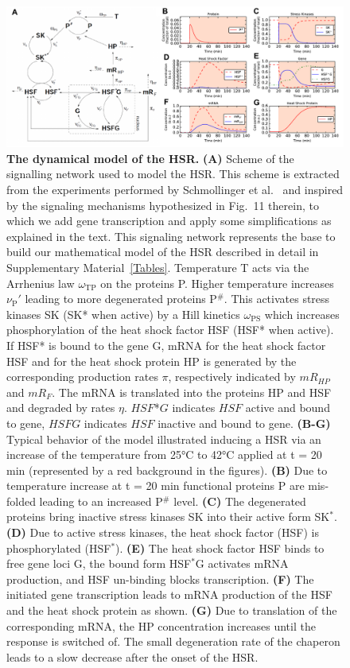 \documentclass[oneside, 10pt, a4paper, twocolumn]{article}
\begin{document}
\begin{figure}
\centering
\includegraphics[width=\textwidth]{Figure1_Paper.pdf}
\caption{\small{\textbf{The dynamical model of the HSR.} \textbf{(A)} Scheme of the signalling network used to model the HSR. {This scheme is extracted from the experiments performed by Schmollinger et al.~\cite{Schmollinger2013} and inspired by the signaling mechanisms hypothesized in Fig.~11 therein, {to} which we add gene transcription and apply some simplifications as explained in the text. This signaling network represents the base to build our mathematical model of the HSR described in detail in Supplementary Material~\ref{Tables}.} Temperature T acts via %
the Arrhenius law $\omega_\text{TP}$ on the proteins P. 
Higher temperature increases $\nu_\text{P}'$ leading to more degenerated proteins P$^\#$. 
This activates stress kinases SK (SK* when active) by a {Hill kinetics} $\omega_\text{PS}$ which increases {phosphorylation} of the heat shock factor HSF (HSF* when active). 
If HSF* is bound to the gene G, mRNA for the heat shock factor HSF and for the heat shock protein HP is generated by the corresponding production rates $\pi$, respectively indicated by $mR_{HP}$ and $mR_{F}$. 
The mRNA is translated into the proteins HP and HSF and degraded by rates $\eta$. $HSF$*$G$ indicates $HSF$ active and bound to gene, $HSFG$ indicates $HSF$ inactive and bound to gene. \textbf{(B-G)} Typical behavior of the model illustrated inducing a HSR via an increase of the temperature from 25°C to 42°C applied at t = 20 min (represented by a red background in the figures). \textbf{(B)} Due to temperature increase at t = 20 min functional proteins P are mis-folded leading to an increased P$^\#$ level. \textbf{(C)} The degenerated proteins bring inactive stress kinases SK into their active form SK$^*$. \textbf{(D)} Due to active stress kinases, the heat shock factor (HSF) is phosphorylated (HSF$^*$). \textbf{(E)} The heat shock factor HSF binds to free gene loci G, the bound form HSF$^*$G activates mRNA production, and HSF un-binding blocks transcription. \textbf{(F)} The initiated gene transcription leads to mRNA production of the HSF and the heat shock protein as shown. \textbf{(G)} Due to translation of the corresponding mRNA, the HP concentration increases until the response is switched of. The small degeneration rate of the chaperon leads to a slow decrease after the onset of the HSR.
}}
\end{figure}
\end{document}
